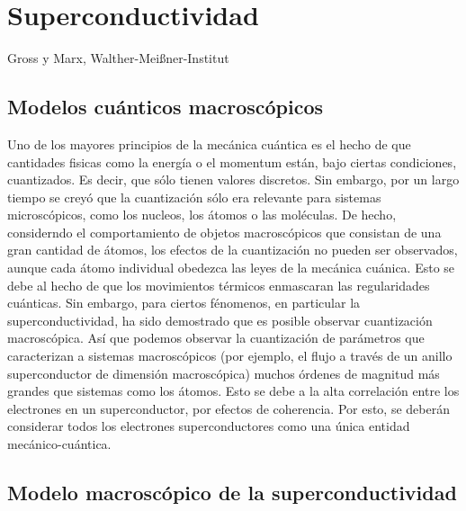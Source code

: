 \chapter{Superconductividad}

Gross y Marx, Walther-Meißner-Institut \cite{gross}

\section{Modelos cuánticos macroscópicos}

Uno de los mayores principios de la mecánica cuántica es el hecho de que cantidades fisicas como la energía o el momentum están, bajo ciertas condiciones, cuantizados. Es decir, que sólo tienen valores discretos. Sin embargo, por un largo tiempo se creyó que la cuantización sólo era relevante para sistemas microscópicos, como los nucleos, los átomos o las moléculas. De hecho, considerndo el comportamiento de objetos macroscópicos que consistan de una gran cantidad de átomos, los efectos de la cuantización no pueden ser observados, aunque cada átomo individual obedezca las leyes de la mecánica cuánica. Esto se debe al hecho de que los movimientos térmicos enmascaran las regularidades cuánticas. Sin embargo, para ciertos fénomenos, en particular la superconductividad, ha sido demostrado que es posible observar cuantización macroscópica. Así que podemos observar la cuantización de parámetros que caracterizan a sistemas macroscópicos (por ejemplo, el flujo a través de un anillo superconductor de dimensión macroscópica) muchos órdenes de magnitud más grandes que sistemas como los átomos. Esto se debe a la alta correlación entre los electrones en un superconductor, por efectos de coherencia. Por esto, se deberán considerar todos los electrones superconductores como una única entidad mecánico-cuántica.

\section{Modelo macroscópico de la superconductividad}


